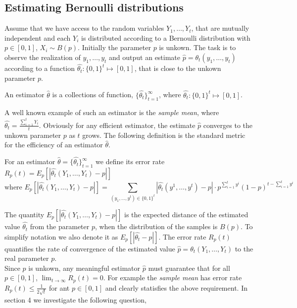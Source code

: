 
\subsection{Estimating Bernoulli distributions}

Assume that we have access to the random variables $Y_1,\ldots,Y_t$, that are
mutually independent and each
$Y_i$ is distributed according to a Bernoulli distribution with $p \in [0,1]$,
$X_i\sim B(p)$.  Initially the parameter $p$ is unkown. The task is to observe
the realization of $y_1,\ldots,y_t$ and output an estimate
$\hat{p}=\theta_t(y_1,\ldots,y_t)$ according to a function $\hat{\theta_t}:
\{0,1\}^t\mapsto [0,1]$, that is close to the unkown parameter $p$.

\begin{definition}
  An estimator $\hat{\theta}$ is a collections of function,
  $\{\hat{\theta_t}\}_{t=1}^{\infty}$, where
  $\hat{\theta_t}: \{0,1\}^t\mapsto [0,1]$.
\end{definition}

A well known example of such an estimator is the
\emph{sample mean}, where $\hat{\theta_t}=\frac{\sum_{i=1}^tY_i}{t}$.
\noindent Obviously for any efficient estimator, the estimate $\hat{p}$
converges to the unkown parameter $p$ as $t$ grows. The following definition is
the standard metric for the efficiency of an estimator $\hat{\theta}$.

\begin{definition}
  For an estimator $\hat{\theta}
  =\{\hat{\theta_t}\}_{t=1}^\infty$ we define its  error rate $R_p(t) =
  E_p[|\hat{\theta_t}(Y_1,\ldots,Y_t) - p|]$ \[\text{where
    }E_p[|\hat{\theta_t}(Y_1,\ldots,Y_t) - p|]= \sum_{(y_1,\ldots,y^t)\in
      \{0,1\}^t}|\hat{\theta_t}(y^1,\ldots,y^t) -p| \cdot
    p^{\sum_{i=1}^ty^i}(1-p)^{t-\sum_{i=1}^ty^i}\]
\end{definition}

The quantity $E_p[|\hat{\theta_t}(Y_1,\ldots,Y_t) - p|]$ is the expected distance
of the estimated value $\hat{\theta_t}$ from the parameter $p$, when the
distribution of the samples is $B(p)$. To simplify notation we also denote it
as $E_p[|\hat{\theta_t} - p|]$. The error rate $R_p(t)$ quantifies the rate of
convergence of the estimated value $\hat{p} =\theta_t(Y_1,\ldots,Y_t)$ to the
real parameter $p$. \\ Since $p$ is unkown, any meaningful estimator $\hat{p}$
must guarantee that for all $p \in [0,1]$, $\lim_{t \rightarrow \infty}
R_p(t)=0$. For example the \emph{sample mean} has error rate $R_p(t) \leq
\frac{1}{2\sqrt{t}}$ for ant $p \in [0,1]$ and clearly statisfies the above
requirement. In section 4 we investigate the following question,

